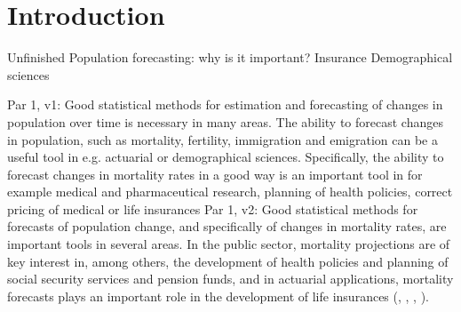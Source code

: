 \section{Introduction}
\textcolor{myDarkBlue}{Unfinished}
\textcolor{myDarkGreen}{
Population forecasting: why is it important? 
Insurance
Demographical sciences}

\newpar \textcolor{myBluePurple}{Par 1, v1: }Good statistical methods for estimation and forecasting of changes in population over time is necessary in many areas. The ability to forecast changes in population, such as mortality, fertility, immigration and emigration can be a useful tool in e.g. actuarial or demographical sciences. Specifically, the ability to forecast changes in mortality rates in a good way is an important tool in for example medical and pharmaceutical research, planning of health policies, correct pricing of medical or life insurances
\newline
\textcolor{myBluePurple}{Par 1, v2: }Good statistical methods for forecasts of population change, and specifically of changes in mortality rates, are important tools in several areas. In the public sector, mortality projections are of key interest in, among others, the development of health policies and planning of social security services and pension funds, and in actuarial applications, mortality forecasts plays an important role in the development of life insurances (\textcite{BROUHNS2002373}, \textcite{RENSHAW2006556}, \textcite{CZADO2005260}, \textcite{LeeCarter1992}). 

